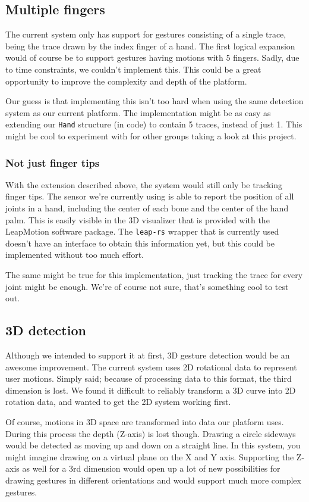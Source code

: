 \documentclass[a4paper]{article}
\begin{document}
  \subsection*{Multiple fingers}
  The current system only has support for gestures consisting of a single trace,
  being the trace drawn by the index finger of a hand. The first logical
  expansion would of course be to support gestures having motions with 5
  fingers. Sadly, due to time constraints, we couldn't implement this.
  This could be a great opportunity to improve the complexity and depth of the platform.

  Our guess is that implementing this isn't too hard when using the same
  detection system as our current platform. The implementation might be as easy
  as extending our \verb_Hand_ structure (in code) to contain 5 traces, instead
  of just 1. This might be cool to experiment with for other groups taking a
  look at this project.

  \subsubsection*{Not just finger tips}
  With the extension described above, the system would still only be tracking
  finger tips. The sensor we're currently using is able to report the position
  of all joints in a hand, including the center of each bone and the center of
  the hand palm. This is easily visible in the 3D visualizer that is provided
  with the LeapMotion software package. The \verb_leap-rs_ wrapper that is
  currently used doesn't have an interface to obtain this information yet,
  but this could be implemented without too much effort.

  The same might be true for this implementation, just tracking the trace for
  every joint might be enough. We're of course not sure, that's something cool
  to test out.

  \subsection*{3D detection}
  Although we intended to support it at first, 3D gesture detection would be an
  awesome improvement. The current system uses 2D rotational data to represent
  user motions. Simply said; because of processing data to this format, the
  third dimension is lost. We found it difficult to reliably transform a 3D
  curve into 2D rotation data, and wanted to get the 2D system working first.

  Of course, motions in 3D space are transformed into data our platform uses.
  During this process the depth (Z-axis) is lost though. Drawing a circle
  sideways would be detected as moving up and down on a straight line. In this
  system, you might imagine drawing on a virtual plane on the X and Y axis.
  Supporting the Z-axis as well for a 3rd dimension would open up a lot of new
  possibilities for drawing gestures in different orientations and would support
  much more complex gestures.
\end{document}
